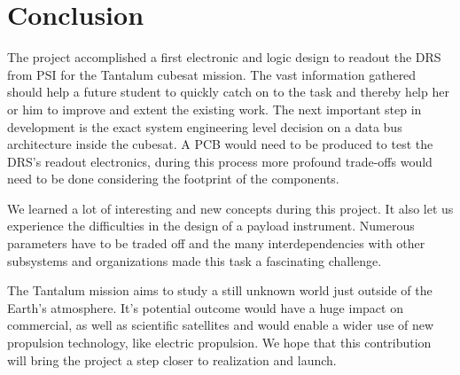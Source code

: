 \section{Conclusion}
\label{sec:conclusion}
The project accomplished a first electronic and logic design to readout the DRS from PSI for the Tantalum cubesat mission.
The vast information gathered should help a future student to quickly catch on to the task and thereby help her or him to improve and extent the existing work.
The next important step in development is the exact system engineering level decision on a data bus architecture inside the cubesat.
A PCB would need to be produced to test the DRS's readout electronics, during this process more profound trade-offs would need to be done considering the footprint of the components.

We learned a lot of interesting and new concepts during this project.
It also let us experience the difficulties in the design of a payload instrument.
Numerous parameters have to be traded off and the many interdependencies with other subsystems and organizations made this task a fascinating challenge.

The Tantalum mission aims to study a still unknown world just outside of the Earth's atmosphere.
It's potential outcome would have a huge impact on commercial, as well as scientific satellites and would enable a wider use of new propulsion technology, like electric propulsion.
We hope that this contribution will bring the project a step closer to realization and launch.

